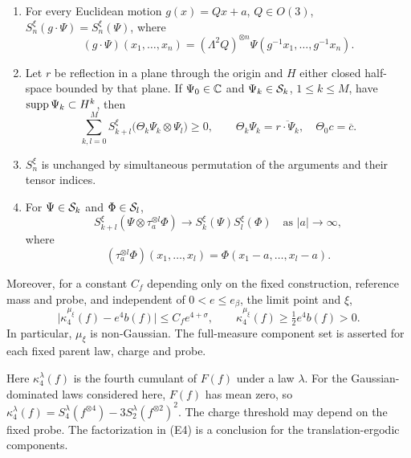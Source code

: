 \begin{theorem}
\begin{enumerate}
\begin{equation}
 |S_n^\xi(\Psi)|\le2\,66^n\sqrt{n!}\,q_{6n}(\Psi),\qquad
 q_m(\Psi)=\max_{|\alpha|\le m}\sup_y
 (1+|y|^2)^{m/2}|\partial^\alpha\Psi(y)|,
\end{equation}
where the maximum is also over tensor components.
\item[\textup{(E1)}] For every Euclidean motion $g(x)=Qx+a$,
$Q\in O(3)$, $S_n^\xi(g\cdot\Psi)=S_n^\xi(\Psi)$, where
\[
 (g\cdot\Psi)(x_1,\ldots,x_n)
 =(\Lambda^2Q)^{\otimes n}\Psi(g^{-1}x_1,\ldots,g^{-1}x_n).
\]
\item[\textup{(E2)}] Let $r$ be reflection in a plane through the origin
and $H$ either closed half-space bounded by that plane.
If $\Psi_0\in\mathbb C$ and $\Psi_k\in\mathcal S_k$, $1\le k\le M$,
have $\operatorname{supp}\Psi_k\subset H^k$, then
\begin{equation}\label{eq:main-rp}
 \sum_{k,l=0}^M S_{k+l}^\xi
 \bigl(\Theta_k\Psi_k\otimes\Psi_l\bigr)\ge0,
 \qquad \Theta_k\Psi_k=\overline{r\cdot\Psi_k},\quad
 \Theta_0c=\overline c.
\end{equation}
\item[\textup{(E3)}] $S_n^\xi$ is unchanged by simultaneous permutation
of the arguments and their tensor indices.
\item[\textup{(E4)}] For $\Psi\in\mathcal S_k$ and $\Phi\in\mathcal S_l$,
\begin{equation}\label{eq:main-cluster}
 S_{k+l}^\xi(\Psi\otimes\tau_a^{\otimes l}\Phi)
 \longrightarrow S_k^\xi(\Psi)S_l^\xi(\Phi)
 \quad\text{as }|a|\longrightarrow\infty,
\end{equation}
where
\[
 (\tau_a^{\otimes l}\Phi)(x_1,\ldots,x_l)
 =\Phi(x_1-a,\ldots,x_l-a).
\]
\end{enumerate}
Moreover, for a constant $C_f$ depending only on the fixed
construction, reference mass and probe, and independent of
$0<e\le e_\beta$, the limit point and $\xi$,
\begin{equation}\label{eq:main-cumulant}
 \bigl|\kappa_4^{\mu_\xi}(f)-e^4b(f)\bigr|
 \le C_f e^{4+\sigma},\qquad
 \kappa_4^{\mu_\xi}(f)\ge\tfrac12e^4b(f)>0.
\end{equation}
In particular, $\mu_\xi$ is non-Gaussian.
The full-measure component set is asserted for each fixed parent
law, charge and probe.
\end{theorem}

Here $\kappa_4^\lambda(f)$ is the fourth cumulant of $F(f)$ under a
law $\lambda$. For the Gaussian-dominated laws considered here,
$F(f)$ has mean zero, so
$\kappa_4^\lambda(f)=S_4^\lambda(f^{\otimes4})
-3S_2^\lambda(f^{\otimes2})^2$.
The charge threshold may depend on the fixed probe.
The factorization in \textup{(E4)} is a conclusion for the
translation-ergodic components.

